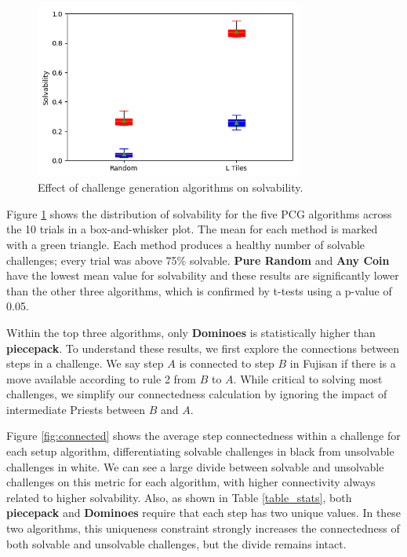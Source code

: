 \documentclass[journal]{IEEEtran}
\begin{document}
\begin{figure}[t]
\includegraphics[width=8.8cm]{boxonsolve.png}
\caption{Effect of challenge generation algorithms on solvability.}
\label{fig:strategycomp}
\end{figure}

Figure \ref{fig:strategycomp} shows the distribution of solvability for the five PCG algorithms across the 10 trials in a box-and-whisker plot. The mean for each method is marked with a green triangle. Each method produces a healthy number of solvable challenges; every trial was above 75\% solvable. {\bf Pure Random} and {\bf Any Coin} have the lowest mean value for solvability and these results are significantly lower than the other three algorithms, which is confirmed by t-tests using a p-value of 0.05. 

Within the top three algorithms, only {\bf Dominoes} is statistically higher than {\bf piecepack}. To understand these results, we first explore the connections between steps in a challenge. We say step $A$ is connected to step $B$ in Fujisan if there is a move available according to rule 2 from $B$ to $A$. While critical to solving most challenges, we simplify our connectedness calculation by ignoring the impact of intermediate Priests between $B$ and $A$. 

Figure \ref{fig:connected} shows the average step connectedness within a challenge for each setup algorithm, differentiating solvable challenges in black from unsolvable challenges in white. We can see a large divide between solvable and unsolvable challenges on this metric for each algorithm, with higher connectivity always related to higher solvability. Also, as shown in Table \ref{table_stats}, both {\bf piecepack} and {\bf Dominoes} require that each step has two unique values. In these two algorithms, this uniqueness constraint strongly increases the connectedness of both solvable and unsolvable challenges, but the divide remains intact.
\end{document}
